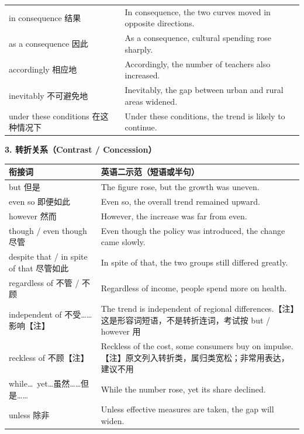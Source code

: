 \documentclass[11pt,a4paper]{ctexart}
\begin{document}
\begin{longtable}{L{5.4cm}L{10.6cm}}
in consequence 结果 & In consequence, the two curves moved in opposite directions. \\
as a consequence 因此 & As a consequence, cultural spending rose sharply. \\
accordingly 相应地 & Accordingly, the number of teachers also increased. \\
inevitably 不可避免地 & Inevitably, the gap between urban and rural areas widened. \\
under these conditions 在这种情况下 & Under these conditions, the trend is likely to continue. \\
\bottomrule
\end{longtable}

\par\addvspace{6pt}\noindent\textbf{3. 转折关系（Contrast / Concession）}\par\addvspace{2pt}
\begin{longtable}{L{5.4cm}L{10.6cm}}
\toprule
\textbf{衔接词} & \textbf{英语二示范（短语或半句）} \\
\midrule
\endhead
but 但是 & The figure rose, but the growth was uneven. \\
even so 即便如此 & Even so, the overall trend remained upward. \\
however 然而 & However, the increase was far from even. \\
though / even though 尽管 & Even though the policy was introduced, the change came slowly. \\
despite that / in spite of that 尽管如此 & In spite of that, the two groups still differed greatly. \\
regardless of 不管 / 不顾 & Regardless of income, people spend more on health. \\
independent of 不受……影响【注】 & The trend is independent of regional differences.【注】这是形容词短语，不是转折连词，考试按 but / however 用 \\
reckless of 不顾【注】 & Reckless of the cost, some consumers buy on impulse.【注】原文列入转折类，属归类宽松；非常用表达，建议不用 \\
while\ldots\ yet\ldots 虽然……但是…… & While the number rose, yet its share declined. \\
unless 除非 & Unless effective measures are taken, the gap will widen. \\
\bottomrule
\end{longtable}
\end{document}
